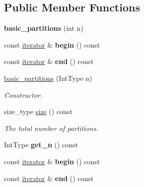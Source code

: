 \subsection*{Public Member Functions}
\begin{DoxyCompactItemize}
\item 
\hypertarget{classdscr_1_1basic__partitions_a62bcdb1e67b4e8fcae85e29e6c60fd63}{{\bfseries basic\-\_\-partitions} (int n)}\label{classdscr_1_1basic__partitions_a62bcdb1e67b4e8fcae85e29e6c60fd63}

\item 
\hypertarget{classdscr_1_1basic__partitions_ab28b04cb9c2905c1de921a51f1d427b3}{const \hyperlink{classdscr_1_1basic__partitions_1_1iterator}{iterator} \& {\bfseries begin} () const }\label{classdscr_1_1basic__partitions_ab28b04cb9c2905c1de921a51f1d427b3}

\item 
\hypertarget{classdscr_1_1basic__partitions_a8e5a436ba43707b0b269df0d264f8a81}{const \hyperlink{classdscr_1_1basic__partitions_1_1iterator}{iterator} \& {\bfseries end} () const }\label{classdscr_1_1basic__partitions_a8e5a436ba43707b0b269df0d264f8a81}

\item 
\hyperlink{classdscr_1_1basic__partitions_aa1bdcf6666b8b022a10c802aaeb4e71a}{basic\-\_\-partitions} (Int\-Type n)
\begin{DoxyCompactList}\small\item\em Constructor. \end{DoxyCompactList}\item 
size\-\_\-type \hyperlink{classdscr_1_1basic__partitions_a3704e667fcafed71d91a75012183f6dc}{size} () const 
\begin{DoxyCompactList}\small\item\em The total number of partitions. \end{DoxyCompactList}\item 
\hypertarget{classdscr_1_1basic__partitions_a16ad5a5a3befa80b635a3d3572619cd4}{Int\-Type {\bfseries get\-\_\-n} () const }\label{classdscr_1_1basic__partitions_a16ad5a5a3befa80b635a3d3572619cd4}

\item 
\hypertarget{classdscr_1_1basic__partitions_ab28b04cb9c2905c1de921a51f1d427b3}{const \hyperlink{classdscr_1_1basic__partitions_1_1iterator}{iterator} \& {\bfseries begin} () const }\label{classdscr_1_1basic__partitions_ab28b04cb9c2905c1de921a51f1d427b3}

\item 
\hypertarget{classdscr_1_1basic__partitions_a8e5a436ba43707b0b269df0d264f8a81}{const \hyperlink{classdscr_1_1basic__partitions_1_1iterator}{iterator} \& {\bfseries end} () const }\label{classdscr_1_1basic__partitions_a8e5a436ba43707b0b269df0d264f8a81}


\end{DoxyCompactItemize}
